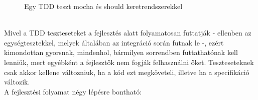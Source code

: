 \begin{figure}[H]
	\centering
		
		\caption{Egy TDD teszt mocha és should keretrendszerekkel}
		\label{fig:mocha_should_tdd_test}
\end{figure}
\hfill\\
Mivel a TDD teszteseteket a fejlesztés alatt folyamatosan futtatják - ellenben az egységtesztekkel, melyek általában az integráció során futnak le -, ezért kimondottan gyorsnak, mindenhol, bármilyen sorrendben futtathatónak kell lenniük, mert egyébként a fejlesztők nem fogják felhasználni őket. Teszteseteknek csak akkor kellene változniuk, ha a kód ezt megköveteli, illetve ha a specifikáció változik.
\hfill\\
A fejlesztési folyamat négy lépésre bontható:
\hfill\\
